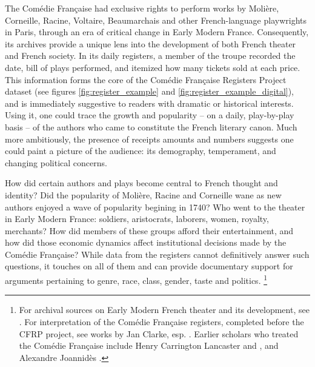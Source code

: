 \documentclass[	DIV=calc,%
							paper=a4,%
							fontsize=11pt,%
							twocolumn]{scrartcl}	 					%
\begin{document}
The Comédie Française had exclusive rights to perform works by Molière, Corneille, Racine, Voltaire, Beaumarchais and other French-language playwrights in Paris, through an era of critical change in Early Modern France.  Consequently, its archives provide a unique lens into the development of both French theater and French society.  In its daily registers, a member of the troupe recorded the date, bill of plays performed, and itemized how many tickets sold at each price.  This information forms the core of the Comédie Française Registers Project dataset (see figures \ref{fig:register_example} and \ref{fig:register_example_digital}), and is immediately suggestive to readers with dramatic or historical interests.  Using it, one could trace the growth and popularity -- on a daily, play-by-play basis -- of the authors who came to constitute the French literary canon.  Much more ambitiously, the presence of receipts amounts and numbers suggests one could paint a picture of the audience: its demography, temperament, and changing political concerns.

How did certain authors and plays become central to French thought and identity?  Did the popularity of Molière, Racine and Corneille wane as new authors enjoyed a wave of popularity begining in 1740?  Who went to the theater in Early Modern France: soldiers, aristocrats, laborers, women, royalty, merchants?  How did members of these groups afford their entertainment, and how did those economic dynamics affect institutional decisions made by the Comédie Française?  While data from the registers cannot definitively answer such questions, it touches on all of them and can provide documentary support for arguments pertaining to genre, race, class, gender, taste and politics.%
\footnote{For archival sources on Early Modern French theater and its development, see \cite{HOWARTH:1997}. For interpretation of the Comédie Française registers, completed before the CFRP project, see works by Jan Clarke, esp. \cite{CLARKE:2001}.  Earlier scholars who treated the Comédie Française include Henry Carrington Lancaster \cite{LANCASTER:1941} and \cite{LANCASTER:1951}, and Alexandre Joannidès \cite{JOANNIDES:1901}.}
\end{document}
